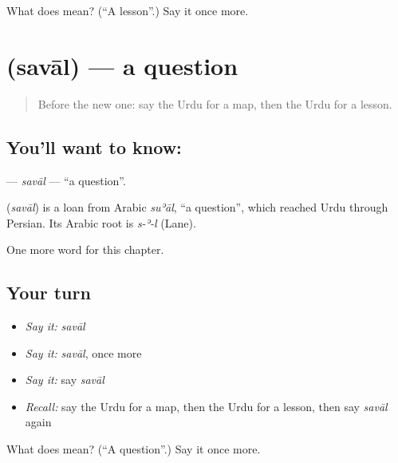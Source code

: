 \begin{tcolorbox}[breakable,colback=teal!4,colframe=teal!35!black,title={Before you move on}]
What does  mean? (\textquotedblleft{}A lesson\textquotedblright{}.) Say it once more.
\end{tcolorbox}
\section[\texorpdfstring{\ur{سوال} (savāl)}{سوال (savāl)}]{ (savāl) — a question}

\label{lesson:UR-C62-saval}



\begin{quote}
Before the new one: say the Urdu for a map, then the Urdu for a lesson.
\end{quote}

\subsection*{You'll want to know: }
\textbf{} — \emph{savāl} — \textquotedblleft{}a question\textquotedblright{}.

\begin{cousinweb}
\textbf{} (\emph{savāl}) is a loan from Arabic \emph{suʾāl}, \textquotedblleft{}a question\textquotedblright{}, which reached Urdu through Persian. Its Arabic root is \emph{s-ʾ-l} (Lane).
\end{cousinweb}

\begin{grammarlens}[title={What you've built}]
One more word for this chapter.
\end{grammarlens}

\subsection*{Your turn}
\begin{itemize}
\raggedright
  \item \emph{Say it:} \emph{savāl}
  \item \emph{Say it:} \emph{savāl}, once more
  \item \emph{Say it:} say \emph{savāl}
  \item \emph{Recall:} say the Urdu for a map, then the Urdu for a lesson, then say \emph{savāl} again
\end{itemize}

\begin{tcolorbox}[breakable,colback=teal!4,colframe=teal!35!black,title={Before you move on}]
What does  mean? (\textquotedblleft{}A question\textquotedblright{}.) Say it once more.
\end{tcolorbox}
